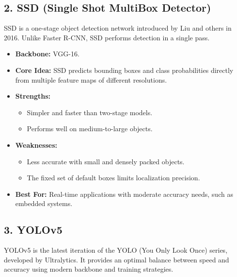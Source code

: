 \documentclass[12pt]{article}
\begin{document}
\subsection*{2. SSD (Single Shot MultiBox Detector)}

SSD is a one-stage object detection network introduced by Liu and others in 2016. Unlike Faster R-CNN, SSD performs detection in a single pass.

\begin{itemize}
    \item \textbf{Backbone:} VGG-16.
    \item \textbf{Core Idea:} SSD predicts bounding boxes and class probabilities directly from multiple feature maps of different resolutions.
    \item \textbf{Strengths:}
    \begin{itemize}
        \item Simpler and faster than two-stage models.
        \item Performs well on medium-to-large objects.
    \end{itemize}
    \item \textbf{Weaknesses:}
    \begin{itemize}
        \item Less accurate with small and densely packed objects.
        \item The fixed set of default boxes limits localization precision.
    \end{itemize}
    \item \textbf{Best For:} Real-time applications with moderate accuracy needs, such as embedded systems.
\end{itemize}

\subsection*{3. YOLOv5}

YOLOv5 is the latest iteration of the YOLO (You Only Look Once) series, developed by Ultralytics. It provides an optimal balance between speed and accuracy using modern backbone and training strategies.
\end{document}
